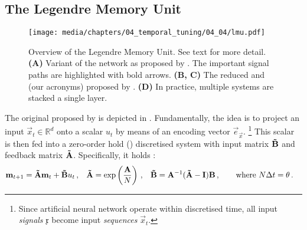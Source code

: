 

\subsection{The Legendre Memory Unit}
\label{sec:lmu}

\begin{figure}[p]
	\centering
	\texttt{[image: media/chapters/04\_temporal\_tuning/04\_04/lmu.pdf]}%
	{\label{fig:lmu_a}}%
	{\label{fig:lmu_b}}%
	{\label{fig:lmu_c}}%
	{\label{fig:lmu_d}}%
	\caption[Overview of the Legendre Memory Unit]{Overview of the Legendre Memory Unit. See text for more detail. \textbf{(A)} Variant of the \LMU network as proposed by \citet{voelker2019lmu}. The important signal paths are highlighted with bold arrows.
	\textbf{(B, C)} The reduced \LRGF and \FIR \LMU (our acronyms) proposed by \citet{chilkuri2021parallelizing}. \textbf{(D)} In practice, multiple \LDN systems are stacked a single layer.}
\end{figure}

The original \LMU proposed by \citet{voelker2019lmu} is depicted in .
Fundamentally, the idea is to project an input $\vec x_t \in \mathbb{R}^d$ onto a scalar $u_t$ by means of an encoding vector $\vec e_{\vec x}$.%
\footnote{Since artificial neural network operate within discretised time, all input \emph{signals} $\mathfrak{x}$ become input \emph{sequences} ${\vec x}_t$.}
This scalar is then fed into a zero-order hold (\ZOH) discretised \LDN system with input matrix $\mathbf{\tilde B}$ and feedback matrix $\mathbf{\tilde A}$.
Specifically, it holds \citep[e.g.,][Section~9.8]{brogan1991modern}:
\begin{align}
	\mathbf{m}_{t + 1} &= \mathbf{\tilde A} \mathbf{m}_t + \mathbf{\tilde B} u_t \,,
	& \mathbf{\tilde A} &= \exp\left(\frac{\mathbf{A}}{N}\right) \,,
	& \mathbf{\tilde B} &= {\mathbf{A}}^{-1} (\mathbf{\tilde A} - \mathbf{I}) \mathbf{B} \,,
	\quad\quad \text{where } N \Delta t = \theta \,.
	\label{eqn:ldn_discretisation}
\end{align}

